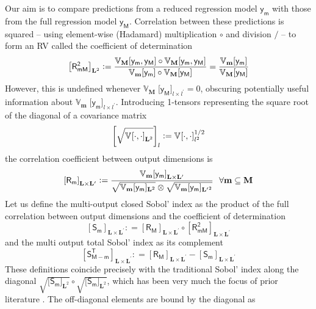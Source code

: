 \documentclass[preprint,12pt]{elsarticle}
\newcommand*{\M}[1]{\ensuremath{#1}\xspace}
\newcommand*{\x}{\times}
\newcommand*{\mi}[1]{\mathbf{#1}}
\newcommand*{\rv}[1]{\mathsf{#1}}
\newcommand*{\te}[2][]{\left\lbrack{#2}\right\rbrack_{#1}}
\newcommand*{\tte}[2][]{\lbrack{#2}\rbrack_{#1}}
\newcommand*{\deq}{\M{\mathrel{\mathop:}=}}
\newcommand*{\cov}[3][]{\ifthenelse{\equal{#1}{}}{\mathbb{V}_{#3}\!\left\lbrack{#2}\right\rbrack}{\mathbb{V}_{#3}\!\left\lbrack{#2,#1}\right\rbrack}}
\newcommand*{\covt}[2]{\mathbb{V}_{#2}\!{#1}}
\begin{document}
    Our aim is to compare predictions from a reduced regression model $\rv{y_m}$ with those from the full regression model $\rv{y_M}$. Correlation between these predictions is squared -- using element-wise (Hadamard) multiplication $\circ$ and division $/$ -- to form an RV called the coefficient of determination
    \begin{equation}
        \te[\mi{L}^2]{\rv{R_{mM}^{2}}} \deq 
        \frac{\cov[\rv{y_M}]{\rv{y_m}}{\mi{M}} \circ \cov[\rv{y_M}]{\rv{y_m}}{\mi{M}}}
        {\cov{\rv{y_m}}{\mi{m}} \circ \cov{\rv{y_M}}{\mi{M}}} =
        \frac{\cov{\rv{y_m}}{\mi{m}}}{\cov{\rv{y_M}}{\mi{M}}}
    \end{equation}
    However, this is undefined whenever $\covt{\;\tte[l\x l^{\prime}]{\rv{y_M}}}{\mi{M}} = 0$, obscuring potentially useful information about $\covt{\;\tte[l\x l^{\prime}]{\rv{y_m}}}{\mi{m}}$. Introducing 1-tensors representing the square root of the diagonal of a covariance matrix
    \begin{equation}
        \te[l]{\sqrt{\cov[\cdot]{\cdot}{}_{\mi{L}^{2}}}} \deq \cov[\cdot]{\cdot}{}_{l^2}^{1/2}
    \end{equation}
    the correlation coefficient between output dimensions is
    \begin{equation}
        \te[\mi{L\x L^{\prime}}]{\rv{R_{m}}} \deq \frac{\cov{\rv{y_m}}{\mi{m}}_{\mi{L\x L^{\prime}}}} {\sqrt{\covt{\,\tte[\mi{L}^2]{\rv{y_m}}}{\mi{m}}}\otimes\sqrt{\covt{\,\tte[\mi{L^{\prime}}^2]{\rv{y_m}}}{\mi{m}}}}
        \ \ \forall \mi{m}\subseteq \mi{M}
    \end{equation}
    Let us define the multi-output closed Sobol' index as the product of the full correlation between output dimensions and the coefficient of determination
    \begin{equation}
            \te[\mi{L\x L^{\prime}}]{\rv{S_m}} \deq \te[\mi{L\x L^{\prime}}]{\rv{R_{M}}} \circ \te[\mi{L\x L^{\prime}}]{\rv{R_{mM}^{2}}} 
    \end{equation}
    and the multi output total Sobol' index as its complement
    \begin{equation}
        \te[\mi{L\x L^{\prime}}]{\rv{S^{T}_{M-m}}} \deq \te[\mi{L\x L^{\prime}}]{\rv{R_M}} - \te[\mi{L\x L^{\prime}}]{\rv{S_m}}
    \end{equation}
    These definitions coincide precisely with the traditional Sobol' index along the diagonal $\sqrt{\tte[\mi{L}^{2}]{\rv{S_m}}} \circ \sqrt{\tte[\mi{L}^{2}]{\rv{S_m}}}$, which has been very much the focus of prior literature \cite{Gamboa.etal2013,Xiao2017,GarciaCabrejo2014}. The off-diagonal elements are bound by the diagonal as
\end{document}
